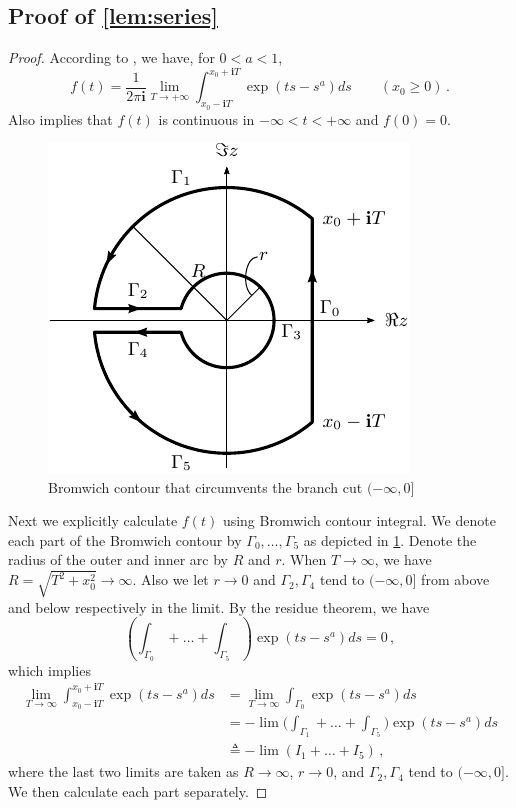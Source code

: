 \documentclass[11pt]{article}
\renewcommand{\i}{\mathbf{i}}
\begin{document}
\subsection{Proof of \cref{lem:series}}\label{sec:proof-series}
\begin{proof}

According to \cite[Theorem 28.2]{doetsch1974introduction}, we have, for $0<a<1$,
\[
f(t) = \frac{1}{2\pi \i}\lim_{T\to +\infty}\int_{x_0-\i T}^{x_0+\i T} \exp(ts-s^a) ds\qquad (x_0\ge 0)\,.
\]
Also \cite[Theorem 28.2]{doetsch1974introduction} implies that $f(t)$ is continuous in $-\infty<t<+\infty$ and $f(0)=0$. 

\begin{figure}[htb]
    \centering
    \includegraphics[]{pix/contour.pdf}
    \caption{Bromwich contour that circumvents the branch cut $(-\infty,0]$}
    \label{fig:contour}
\end{figure}

Next we explicitly calculate $f(t)$ using Bromwich contour integral. We denote each part of the Bromwich contour by $\Gamma_0,\ldots,\Gamma_5$ as depicted in \cref{fig:contour}. Denote the radius of the outer and inner arc by $R$ and $r$. When $T\to\infty$, we have $R=\sqrt{T^2+x_0^2}\to\infty$. Also we let $r\to 0$ and $\Gamma_2,\Gamma_4$ tend to $(-\infty,0]$ from above and below respectively in the limit. By the residue theorem, we have
\[\left(\int_{\Gamma_0}+\ldots+\int_{\Gamma_5}\right)\exp(ts-s^a)  ds=0\,,\]
which implies
\begin{align*}
    \lim_{T\to\infty}\int_{x_0-\i T}^{x_0+\i T} \exp(ts-s^a) ds &=\lim_{T\to\infty}\int_{\Gamma_0} \exp(ts-s^a) ds\\
    &=-\lim\Big(\int_{\Gamma_1}+\ldots+\int_{\Gamma_5}\Big)\exp(ts-s^a) ds\\
    &\triangleq -\lim(I_1+\ldots+I_5)\,,
\end{align*}
where the last two limits are taken as $R\to\infty$, $r\to 0$, and $\Gamma_2,\Gamma_4$ tend to $(-\infty,0]$. We then calculate each part separately.


\end{proof}
\end{document}
